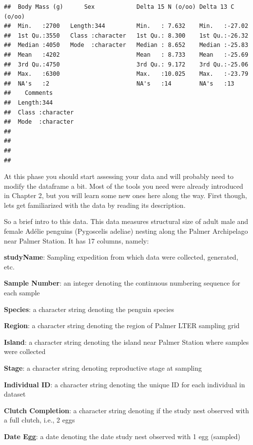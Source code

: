 \documentclass[
]{book}
\begin{document}
\begin{verbatim}
##  Body Mass (g)      Sex            Delta 15 N (o/oo) Delta 13 C (o/oo)
##  Min.   :2700   Length:344         Min.   : 7.632    Min.   :-27.02   
##  1st Qu.:3550   Class :character   1st Qu.: 8.300    1st Qu.:-26.32   
##  Median :4050   Mode  :character   Median : 8.652    Median :-25.83   
##  Mean   :4202                      Mean   : 8.733    Mean   :-25.69   
##  3rd Qu.:4750                      3rd Qu.: 9.172    3rd Qu.:-25.06   
##  Max.   :6300                      Max.   :10.025    Max.   :-23.79   
##  NA's   :2                         NA's   :14        NA's   :13       
##    Comments        
##  Length:344        
##  Class :character  
##  Mode  :character  
##                    
##                    
##                    
## 
\end{verbatim}

At this phase you should start assessing your data and will probably need to modify the dataframe a bit.
Most of the tools you need were already introduced in Chapter 2, but you will learn some new ones here along the way.
First though, lets get familiarized with the data by reading its description.

So a brief intro to this data.
This data measures structural size of adult male and female Adélie penguins (Pygoscelis adeliae) nesting along the Palmer Archipelago near Palmer Station.
It has 17 columns, namely:

\textbf{studyName}: Sampling expedition from which data were collected, generated, etc.

\textbf{Sample Number}: an integer denoting the continuous numbering sequence for each sample

\textbf{Species}: a character string denoting the penguin species

\textbf{Region}: a character string denoting the region of Palmer LTER sampling grid

\textbf{Island}: a character string denoting the island near Palmer Station where samples were collected

\textbf{Stage}: a character string denoting reproductive stage at sampling

\textbf{Individual ID}: a character string denoting the unique ID for each individual in dataset

\textbf{Clutch Completion}: a character string denoting if the study nest observed with a full clutch, i.e., 2 eggs

\textbf{Date Egg}: a date denoting the date study nest observed with 1 egg (sampled)
\end{document}
